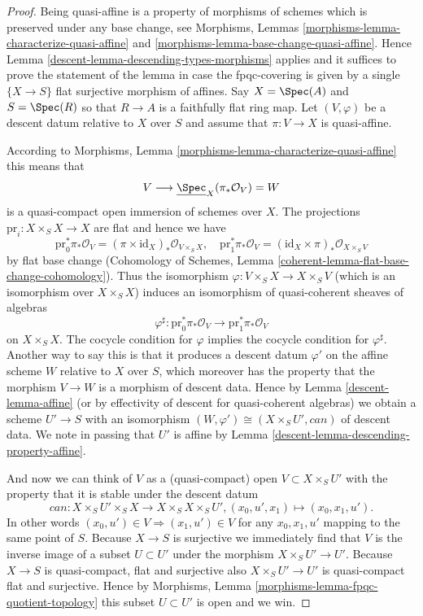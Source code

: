 \begin{proof}

Being quasi-affine is a property of morphisms of schemes
which is preserved under any base change, see
Morphisms, Lemmas \ref{morphisms-lemma-characterize-quasi-affine} and
\ref{morphisms-lemma-base-change-quasi-affine}.
Hence Lemma \ref{descent-lemma-descending-types-morphisms} applies
and it suffices to prove the statement of the lemma
in case the fpqc-covering is given by a single
$\{X \to S\}$ flat surjective morphism of affines.
Say $X = \Spec(A)$ and $S = \Spec(R)$ so
that $R \to A$ is a faithfully flat ring map.
Let $(V, \varphi)$ be a descent datum relative to $X$ over $S$
and assume that $\pi : V \to X$ is quasi-affine.

\medskip\noindent
According to Morphisms, Lemma \ref{morphisms-lemma-characterize-quasi-affine}
this means that
$$
V \longrightarrow \underline{\Spec}_X(\pi_*\mathcal{O}_V) = W
$$
is a quasi-compact open immersion of schemes over $X$.
The projections $\text{pr}_i : X \times_S X \to X$ are flat
and hence we have
$$
\text{pr}_0^*\pi_*\mathcal{O}_V =
(\pi \times \text{id}_X)_*\mathcal{O}_{V \times_S X}, \quad
\text{pr}_1^*\pi_*\mathcal{O}_V =
(\text{id}_X \times \pi)_*\mathcal{O}_{X \times_S V}
$$
by flat base change
(Cohomology of Schemes, Lemma \ref{coherent-lemma-flat-base-change-cohomology}).
Thus the isomorphism $\varphi : V \times_S X \to X \times_S V$ (which
is an isomorphism over $X \times_S X$) induces an isomorphism
of quasi-coherent sheaves of algebras
$$
\varphi^\sharp :
\text{pr}_0^*\pi_*\mathcal{O}_V
\longrightarrow
\text{pr}_1^*\pi_*\mathcal{O}_V
$$
on $X \times_S X$.
The cocycle condition for $\varphi$ implies the cocycle condition
for $\varphi^\sharp$. Another way to say this is that it produces
a descent datum $\varphi'$ on the affine scheme $W$ relative to
$X$ over $S$, which moreover has the property that the morphism
$V \to W$ is a morphism of descent data.
Hence by Lemma \ref{descent-lemma-affine}
(or by effectivity of descent for quasi-coherent
algebras) we obtain a scheme $U' \to S$ with an isomorphism
$(W, \varphi') \cong (X \times_S U', can)$ of descent data.
We note in passing that $U'$ is affine by
Lemma \ref{descent-lemma-descending-property-affine}.

\medskip\noindent
And now we can think of $V$ as a (quasi-compact)
open $V \subset X \times_S U'$ with the property that
it is stable under the descent datum
$$
can : X \times_S U' \times_S X \to X \times_S X \times_S U',
(x_0, u', x_1) \mapsto (x_0, x_1, u').
$$
In other words $(x_0, u') \in V \Rightarrow (x_1, u') \in V$
for any $x_0, x_1, u'$ mapping to the same point of $S$.
Because $X \to S$ is surjective we immediately find that
$V$ is the inverse image of a subset $U \subset U'$ under
the morphism $X \times_S U' \to U'$.
Because $X \to S$ is quasi-compact, flat and surjective
also $X \times_S U' \to U'$ is quasi-compact flat and surjective.
Hence by Morphisms, Lemma \ref{morphisms-lemma-fpqc-quotient-topology}
this subset $U \subset U'$ is open and we win.
\end{proof}

